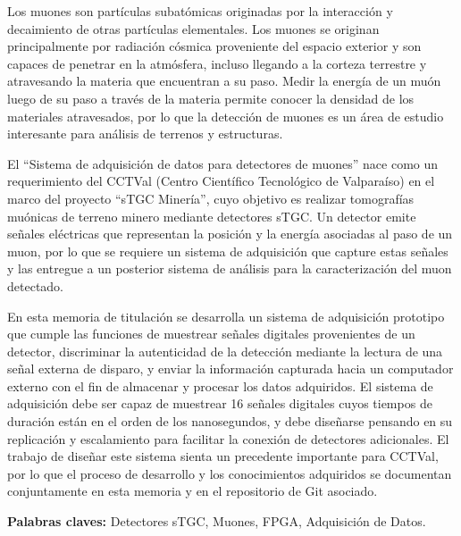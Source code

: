Los muones son partículas subatómicas originadas por la interacción y decaimiento de otras partículas elementales. Los muones se originan principalmente por radiación cósmica proveniente del espacio exterior y son capaces de penetrar en la atmósfera, incluso llegando a la corteza terrestre y atravesando la materia que encuentran a su paso. Medir la energía de un muón luego de su paso a través de la materia permite conocer la densidad de los materiales atravesados, por lo que la detección de muones es un área de estudio interesante para análisis de terrenos y estructuras.

El ``Sistema de adquisición de datos para detectores de muones'' nace como un requerimiento del CCTVal (Centro Científico Tecnológico de Valparaíso) en  el marco del proyecto ``sTGC Minería'', cuyo objetivo es realizar tomografías muónicas de terreno minero mediante detectores sTGC. Un detector emite señales eléctricas que representan la posición y la energía asociadas al paso de un muon, por lo que se requiere un sistema de adquisición que capture estas señales y las entregue a un posterior sistema de análisis para la caracterización del muon detectado.

En esta memoria de titulación se desarrolla un sistema de adquisición prototipo que cumple las funciones de muestrear señales digitales provenientes de un detector, discriminar la autenticidad de la detección mediante la lectura de una señal externa de disparo, y enviar la información capturada hacia un computador externo con el fin de almacenar y procesar los datos adquiridos. El sistema de adquisición debe ser capaz de muestrear 16 señales digitales cuyos tiempos de duración están en el orden de los nanosegundos, y debe diseñarse pensando en su replicación y escalamiento para facilitar la conexión de detectores adicionales. El trabajo de diseñar este sistema sienta un precedente importante para CCTVal, por lo que el proceso de desarrollo y los conocimientos adquiridos se documentan conjuntamente en esta memoria y en el repositorio de Git asociado.

\textbf{Palabras claves:} Detectores sTGC,  Muones, FPGA, Adquisición de Datos.
